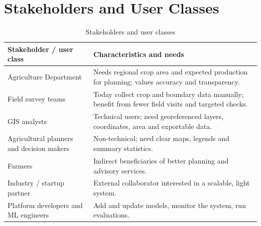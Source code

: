 \section{Stakeholders and User Classes}
\begin{table}[htbp]
\centering\small
\caption{Stakeholders and user classes}
\label{tab:stakeholders}
\begin{tabularx}{\textwidth}{L{4.2cm} Y}
\toprule
\textbf{Stakeholder / user class} & \textbf{Characteristics and needs}\\
\midrule
Agriculture Department & Needs regional crop area and expected production for planning; values accuracy and transparency.\\
Field survey teams & Today collect crop and boundary data manually; benefit from fewer field visits and targeted checks.\\
GIS analysts & Technical users; need georeferenced layers, coordinates, area and exportable data.\\
Agricultural planners and decision makers & Non-technical; need clear maps, legends and summary statistics.\\
Farmers & Indirect beneficiaries of better planning and advisory services.\\
Industry / startup partner & External collaborator interested in a scalable, light system.\\
Platform developers and ML engineers & Add and update models, monitor the system, run evaluations.\\
\bottomrule
\end{tabularx}
\end{table}

